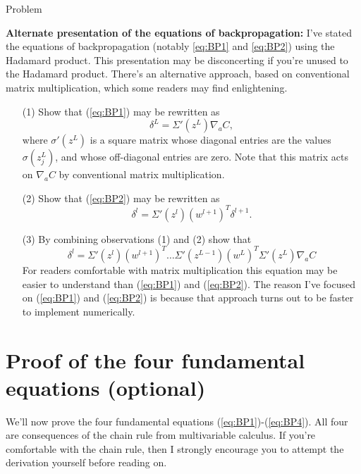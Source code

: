 \documentclass[a4paper,twoside,10pt]{book}
\begin{document}
\begin{exercize}{Problem}
	\item \textbf{Alternate presentation of the equations of backpropagation:} I've stated the equations of backpropagation (notably \ref{eq:BP1} and \ref{eq:BP2}) using the Hadamard product. This presentation may be disconcerting if you're unused to the Hadamard product. There's an alternative approach, based on conventional matrix multiplication, which some readers may find enlightening.
	\begin{enumerate}
		\item[(1)]  Show that (\ref{eq:BP1}) may be rewritten as
		\begin{equation}
			\delta^L = \Sigma'(z^L) \nabla_a C,
			\label{eq:33}
		\end{equation}
		where $\sigma'(z^L)$ is a square matrix whose diagonal entries are the values $\sigma(z^L_j)$, and whose off-diagonal entries are zero. Note that this matrix acts on $\nabla_a C$ by conventional matrix multiplication.
		\item[(2)] Show that (\ref{eq:BP2}) may be rewritten as
		\begin{equation}
			\delta^l = \Sigma'(z^l) (w^{l+1})^T \delta^{l+1}.
			\label{eq:34}
		\end{equation}
		\item[(3)] By combining observations (1) and (2) show that
		\begin{equation}
			\delta^l = \Sigma'(z^l) (w^{l+1})^T \ldots \Sigma'(z^{L-1}) (w^L)^T \Sigma'(z^L) \nabla_a C
			\label{eq:35}
		\end{equation}
		For readers comfortable with matrix multiplication this equation may be easier to understand than (\ref{eq:BP1}) and (\ref{eq:BP2}). The reason I've focused on (\ref{eq:BP1}) and (\ref{eq:BP2}) is because that approach turns out to be faster to implement numerically.
	\end{enumerate}
\end{exercize}
\section{Proof of the four fundamental equations (optional)}
\label{sec:2.5}
We'll now prove the four fundamental equations (\ref{eq:BP1})-(\ref{eq:BP4}). All four are consequences of the chain rule from multivariable calculus. If you're comfortable with the chain rule, then I strongly encourage you to attempt the derivation yourself before reading on.
\end{document}
